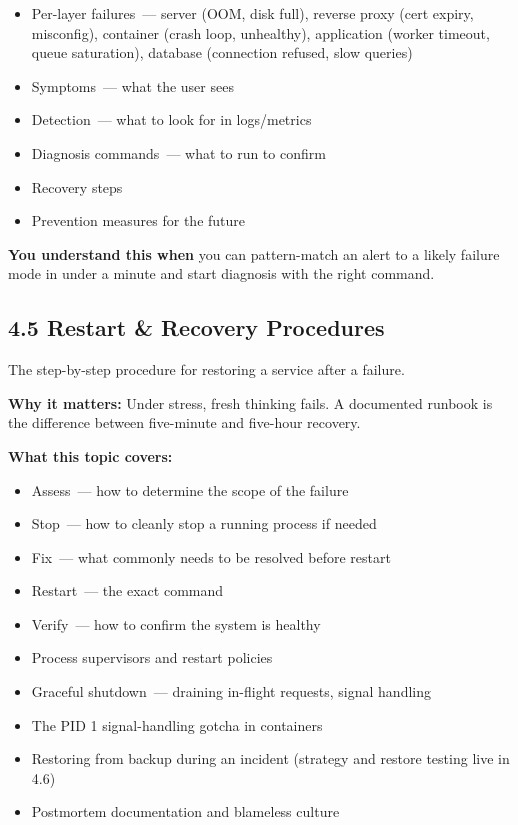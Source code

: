 \begin{itemize}
\tightlist
\item
  Per-layer failures~--- server (OOM, disk full), reverse proxy (cert expiry, misconfig), container (crash loop, unhealthy), application (worker timeout, queue saturation), database (connection refused, slow queries)
\item
  Symptoms~--- what the user sees
\item
  Detection~--- what to look for in logs/metrics
\item
  Diagnosis commands~--- what to run to confirm
\item
  Recovery steps
\item
  Prevention measures for the future
\end{itemize}

\noindent{}\textbf{You understand this when} you can pattern-match an alert to a likely failure mode in under a minute and start diagnosis with the right command.

\subsection*{4.5 Restart \& Recovery Procedures}\label{project-planning-guide:45-restart--recovery-procedures}

The step-by-step procedure for restoring a service after a failure.

\textbf{Why it matters:} Under stress, fresh thinking fails. A documented runbook is the difference between five-minute and five-hour recovery.

\textbf{What this topic covers:}

\begin{itemize}
\tightlist
\item
  Assess~--- how to determine the scope of the failure
\item
  Stop~--- how to cleanly stop a running process if needed
\item
  Fix~--- what commonly needs to be resolved before restart
\item
  Restart~--- the exact command
\item
  Verify~--- how to confirm the system is healthy
\item
  Process supervisors and restart policies
\item
  Graceful shutdown~--- draining in-flight requests, signal handling
\item
  The PID 1 signal-handling gotcha in containers
\item
  Restoring from backup during an incident (strategy and restore testing live in 4.6)
\item
  Postmortem documentation and blameless culture
\end{itemize}

